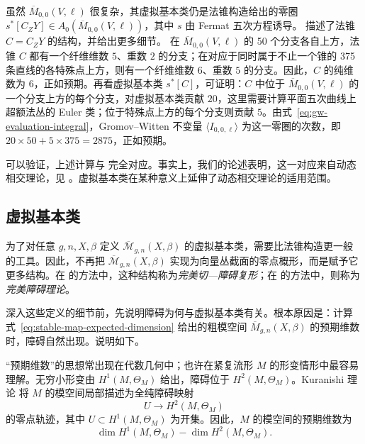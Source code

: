 \begin{example}
虽然 $\overline M_{0,0}(V,\ell)$ 很复杂，其虚拟基本类仍是法锥构造给出的零圈
$s^*[C_ZY]\in A_0(\overline M_{0,0}(V,\ell))$，其中 $s$ 由 Fermat 五次方程诱导。
 描述了法锥 $C=C_ZY$ 的结构，并给出更多细节。
在 $\overline M_{0,0}(V,\ell)$ 的 50 个分支各自上方，法锥 $C$ 都有一个纤维维数 $5$、重数 $2$ 的分支；在对应于同时属于不止一个锥的 375 条直线的各特殊点上方，则有一个纤维维数 $6$、重数 $5$ 的分支。因此，$C$ 的纯维数为 $6$，正如预期。再看虚拟基本类 $s^*[C]$，可证明：$C$ 中位于 $\overline M_{0,0}(V,\ell)$ 的一个分支上方的每个分支，对虚拟基本类贡献 $20$，这里需要计算平面五次曲线上超额法丛的 Euler 类；位于特殊点上方的每个分支则贡献 $5$。由式~\eqref{eq:gw-evaluation-integral}，Gromov--Witten 不变量
$\langle I_{0,0,\ell}\rangle$ 为这一零圈的次数，即
$20\times50+5\times375=2875$，正如预期。

可以验证，上述计算与  完全对应。事实上，我们的论述表明，这一对应来自动态相交理论，见 。虚拟基本类在某种意义上延伸了动态相交理论的适用范围。
\end{example}

\subsection{虚拟基本类}\label{subsec:virtual-fundamental-class}
为了对任意 $g,n,X,\beta$ 定义 $\overline{\mathcal M}_{g,n}(X,\beta)$ 的虚拟基本类，需要比法锥构造更一般的工具。因此，不再把 $\overline{\mathcal M}_{g,n}(X,\beta)$ 实现为向量丛截面的零点概形，而是赋予它更多结构。在  的方法中，这种结构称为\emph{完美切—障碍复形}；在  的方法中，则称为\emph{完美障碍理论}。

深入这些定义的细节前，先说明障碍为何与虚拟基本类有关。根本原因是：计算式~\eqref{eq:stable-map-expected-dimension}
给出的粗模空间 $\overline M_{g,n}(X,\beta)$ 的预期维数时，障碍自然出现。说明如下。

“预期维数”的思想常出现在代数几何中；也许在紧复流形
$M$ 的形变情形中最容易理解。无穷小形变由 $H^1(M,\Theta_M)$ 给出，障碍位于
$H^2(M,\Theta_M)$。Kuranishi 理论  将 $M$ 的模空间局部描述为全纯障碍映射
\begin{equation}\label{eq:kuranishi-obstruction-map}
U\longrightarrow H^2(M,\Theta_M)
\end{equation}
的零点轨迹，其中 $U\subset H^1(M,\Theta_M)$ 为开集。因此，$M$ 的模空间的预期维数为
\[
\dim H^1(M,\Theta_M)-\dim H^2(M,\Theta_M).
\]

